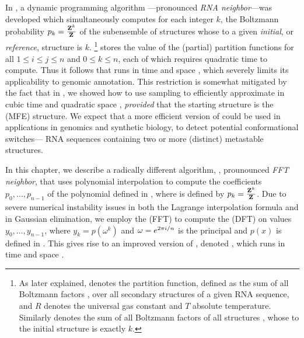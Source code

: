 In \citep{freyhult.b07}, a dynamic programming algorithm
\rnabor---pronounced {\em RNA neighbor}---was developed which simultaneously
computes for
each integer $k$, the Boltzmann probability $p_k = \frac{{\bf Z}^{k}_{}}{{\bf Z}^{}_{}}$
of the subensemble of structures
whose \bpd to a given {\em initial}, or
{\em reference}, structure \strSt is $k$.
\footnote{As later
explained, \fullZ denotes the partition function, defined as the sum of
all Boltzmann factors \boltzf{\str}, over all secondary structures \str
of a given RNA sequence, and $R$ denotes the universal
gas constant and $T$ absolute temperature. Similarly  denotes the
sum of all Boltzmann factors of all structures \str, whose \bpd
to the initial structure \strSt is exactly $k$.}
\rnabor stores the value of the (partial)
partition functions  for all $1 \leq i \leq j \leq n$ and
$0 \leq k \leq n$, each of which requires quadratic time to compute.
Thus it follows that \rnabor runs in time  and space
, which severely limits its applicability to genomic annotation.
This restriction is somewhat mitigated by the fact that
in \citep{cloteloulorenz}, we showed how to use sampling
\citep{ding.nar03} to efficiently approximate
\rnabor in cubic time  and quadratic space ,
{\em provided} that the starting structure \strSt is the \mfe
(MFE) structure. We expect that a more efficient version of
\rnabor could be used in applications in genomics and synthetic
biology, to detect potential conformational switches---
RNA sequences containing two or more (distinct) metastable structures.

In this chapter, we describe a radically different algorithm, \fftbor
\citep{senter.po12},
prounounced {\em FFT neighbor},
that uses polynomial interpolation to compute the
coefficients $p_0,\ldots,p_{n-1}$ of the polynomial defined in
,
where \pk is defined by $p_k = \frac{{\bf Z}^{k}_{}}{{\bf Z}^{}_{}}$.
Due to severe numerical instability issues in both the Lagrange
interpolation formula and in Gaussian elimination, we employ
the \fft (FFT) to compute the \idft (DFT) on values $y_0,\ldots,y_{n-1}$,
where $y_k = p(\omega^k)$ and
$\omega = e^{2 \pi i/n}$ is the principal \nRoU and
$p(x)$ is defined in . This
gives rise to an improved version of \rnabor, denoted \fftbor,
which runs in time  and space .

